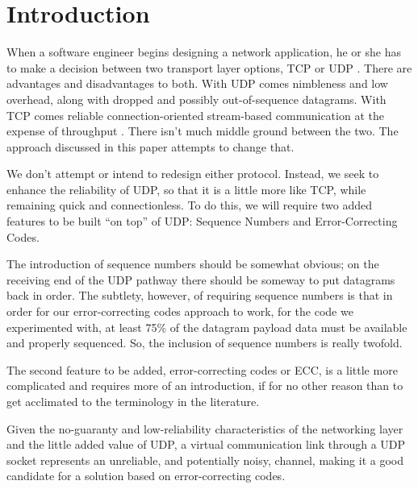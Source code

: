 \documentclass[conference]{IEEEtran}
\theoremstyle{definition}
\begin{document}
%
\IEEEpeerreviewmaketitle



\section{Introduction}
When a software engineer begins designing a
network application, he or she has to make a decision between
two transport layer options, TCP or UDP \cite{kurose2012computer}.
There are advantages and disadvantages to both.  With UDP comes
nimbleness and low overhead, along with dropped and possibly
out-of-sequence datagrams.  With TCP comes reliable connection-oriented
stream-based communication at the expense of throughput \cite{kurose2012computer}.
There isn't much middle ground between the two.  The approach discussed
in this paper attempts to change that.

We don't attempt or intend to redesign either protocol.  Instead,
we seek to enhance the reliability of UDP, so that it is a little
more like TCP, while remaining quick and connectionless.  To do this,
we will require two added features to be built ``on top'' of UDP:
Sequence Numbers and Error-Correcting Codes.

The introduction of sequence numbers should be somewhat obvious;
on the receiving end of the UDP pathway there should be someway
to put datagrams back in order.  The subtlety, however, of requiring
sequence numbers is that in order for our error-correcting codes
approach to work, for the code we experimented with, at least 75\%
of the datagram payload data must be available and properly
sequenced.  So, the inclusion of sequence numbers is really
twofold.

The second feature to be added, error-correcting codes or ECC, is a
little more complicated and requires more of an introduction,
if for no other reason than to get acclimated to the terminology
in the literature.

Given the no-guaranty and low-reliability characteristics of
the networking layer and the little added value of UDP,
a virtual communication link through a UDP socket represents
an unreliable, and potentially noisy, channel, making it
a good candidate for a solution based on error-correcting codes.
\end{document}
